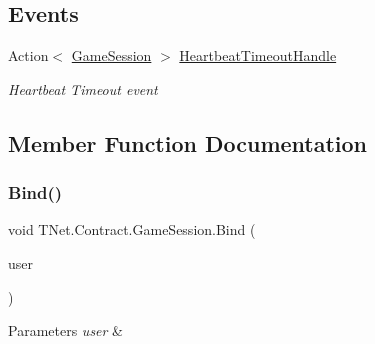 \subsection*{Events}
\begin{DoxyCompactItemize}
\item 
Action$<$ \mbox{\hyperlink{class_t_net_1_1_contract_1_1_game_session}{Game\+Session}} $>$ \mbox{\hyperlink{class_t_net_1_1_contract_1_1_game_session_a20dadeea8c09220c6f3938bfe62fe16b}{Heartbeat\+Timeout\+Handle}}
\begin{DoxyCompactList}\small\item\em Heartbeat Timeout event \end{DoxyCompactList}\end{DoxyCompactItemize}


\subsection{Member Function Documentation}
\mbox{\label{class_t_net_1_1_contract_1_1_game_session_aed518bd0b305cc10225ef785f7d7f86f}} 
\subsubsection{\texorpdfstring{Bind()}{Bind()}}
{\footnotesize\ttfamily void T\+Net.\+Contract.\+Game\+Session.\+Bind (\begin{DoxyParamCaption}\item[{\mbox{\hyperlink{interface_t_net_1_1_context___1_1_i_user}{I\+User}}}]{user }\end{DoxyParamCaption})}






\begin{DoxyParams}{Parameters}
{\em user} & \\
\hline
\end{DoxyParams}
\mbox{\label{class_t_net_1_1_contract_1_1_game_session_abdf2337f56bee6ba4e1924bb2e4d2d09}} 
